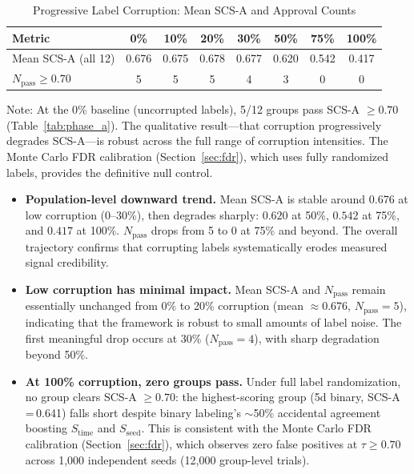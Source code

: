 \documentclass[12pt,a4paper]{article}
\begin{document}
\begin{table}[H]
\centering
\caption{Progressive Label Corruption: Mean SCS-A and Approval Counts}
\label{tab:corruption}
\small
\begin{tabular}{lccccccc}
\toprule
Metric & 0\% & 10\% & 20\% & 30\% & 50\% & 75\% & 100\% \\
\midrule
Mean SCS-A (all 12) & 0.676 & 0.675 & 0.678 & 0.677 & 0.620 & 0.542 & 0.417 \\
$N_{\text{pass}} \geq 0.70$ & 5 & 5 & 5 & 4 & 3 & 0 & 0 \\
\bottomrule
\end{tabular}
\smallskip

\footnotesize{Note: At the 0\% baseline (uncorrupted labels), 5/12 groups pass SCS-A $\geq 0.70$ (Table~\ref{tab:phase_a}). The qualitative result---that corruption progressively degrades SCS-A---is robust across the full range of corruption intensities. The Monte Carlo FDR calibration (Section~\ref{sec:fdr}), which uses fully randomized labels, provides the definitive null control.}
\end{table}

\begin{itemize}
  \item \textbf{Population-level downward trend.} Mean SCS-A is stable around 0.676 at low corruption (0--30\%), then degrades sharply: $0.620$ at 50\%, $0.542$ at 75\%, and $0.417$ at 100\%. $N_{\text{pass}}$ drops from 5 to 0 at 75\% and beyond. The overall trajectory confirms that corrupting labels systematically erodes measured signal credibility.

  \item \textbf{Low corruption has minimal impact.} Mean SCS-A and $N_{\text{pass}}$ remain essentially unchanged from 0\% to 20\% corruption (mean $\approx 0.676$, $N_{\text{pass}}=5$), indicating that the framework is robust to small amounts of label noise. The first meaningful drop occurs at 30\% ($N_{\text{pass}}=4$), with sharp degradation beyond 50\%.

  \item \textbf{At 100\% corruption, zero groups pass.} Under full label randomization, no group clears SCS-A $\geq 0.70$: the highest-scoring group (5d binary, SCS-A\,=\,0.641) falls short despite binary labeling's $\sim$50\% accidental agreement boosting $S_{\text{time}}$ and $S_{\text{seed}}$. This is consistent with the Monte Carlo FDR calibration (Section~\ref{sec:fdr}), which observes zero false positives at $\tau \geq 0.70$ across 1{,}000 independent seeds (12{,}000 group-level trials).
\end{itemize}
\end{document}
